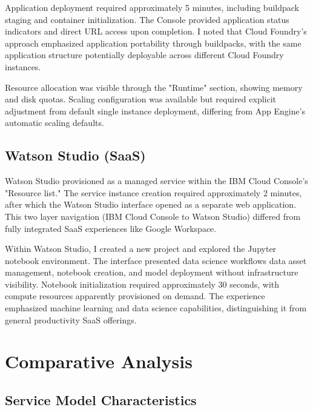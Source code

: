 \documentclass[11pt,a4paper]{article}
\begin{document}
Application deployment required approximately 5 minutes, including buildpack staging and container initialization. The Console provided application status indicators and direct URL access upon completion. I noted that Cloud Foundry's approach emphasized application portability through buildpacks, with the same application structure potentially deployable across different Cloud Foundry instances.

Resource allocation was visible through the "Runtime" section, showing memory and disk quotas. Scaling configuration was available but required explicit adjustment from default single instance deployment, differing from App Engine's automatic scaling defaults.

\subsection{Watson Studio (SaaS)}
Watson Studio provisioned as a managed service within the IBM Cloud Console's "Resource list." The service instance creation required approximately 2 minutes, after which the Watson Studio interface opened as a separate web application. This two layer navigation (IBM Cloud Console to Watson Studio) differed from fully integrated SaaS experiences like Google Workspace.

Within Watson Studio, I created a new project and explored the Jupyter notebook environment. The interface presented data science workflows data asset management, notebook creation, and model deployment without infrastructure visibility. Notebook initialization required approximately 30 seconds, with compute resources apparently provisioned on demand. The experience emphasized machine learning and data science capabilities, distinguishing it from general productivity SaaS offerings.

\section{Comparative Analysis}

\subsection{Service Model Characteristics}
\end{document}
